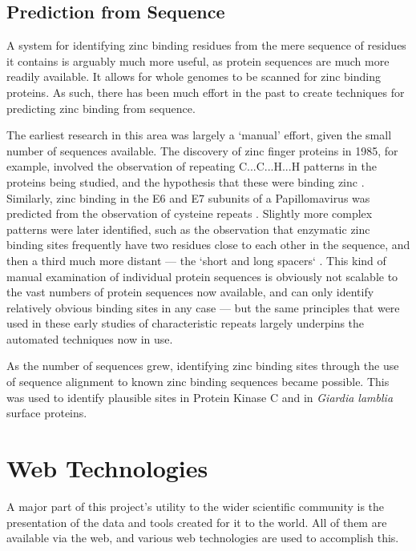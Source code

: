 \subsection{Prediction from Sequence}

A system for identifying zinc binding residues from the mere sequence of residues it contains is arguably much more useful, as protein sequences are much more readily available. It allows for whole genomes to be scanned for zinc binding proteins. As such, there has been much effort in the past to create techniques for predicting zinc binding from sequence.

The earliest research in this area was largely a `manual' effort, given the small number of sequences available. The discovery of zinc finger proteins in 1985, for example, involved the observation of repeating C...C...H...H patterns in the proteins being studied, and the hypothesis that these were binding zinc \cite{miller1985repetitive}. Similarly, zinc binding in the E6 and E7 subunits of a Papillomavirus was predicted from the observation of cysteine repeats \cite{barbosa1989papillomavirus}. Slightly more complex patterns were later identified, such as the observation that enzymatic zinc binding sites frequently have two residues close to each other in the sequence, and then a third much more distant --- the `short and long spacers` \cite{vallee1989short}. This kind of manual examination of individual protein sequences is obviously not scalable to the vast numbers of protein sequences now available, and can only identify relatively obvious binding sites in any case --- but the same principles that were used in these early studies of characteristic repeats largely underpins the automated techniques now in use.

As the number of sequences grew, identifying zinc binding sites through the use of sequence alignment to known zinc binding sequences became possible. This was used to identify plausible sites in Protein Kinase C \cite{bishop1991identification} and in {\it Giardia lamblia} surface proteins.

\section{Web Technologies}

A major part of this project's utility to the wider scientific community is the presentation of the data and tools created for it to the world. All of them are available via the web, and various web technologies are used to accomplish this.

